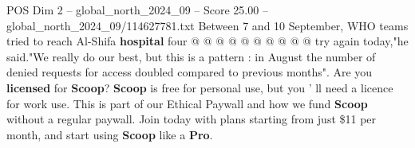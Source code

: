 \begin{textsample}{POS Dim 2 – global\_north\_2024\_09 – Score 25.00 – global\_north\_2024\_09/114627781.txt}
Between 7 and 10 September, WHO teams tried to reach Al-Shifa \textbf{hospital} four @ @ @ @ @ @ @ @ @ @ try again today,"he said."We really do our best, but this is a pattern : in August the number of denied requests for access doubled compared to previous months".
Are you \textbf{licensed} for \textbf{Scoop}? \textbf{Scoop} is free for personal use, but you ' ll need a licence for work use.
This is part of our Ethical Paywall and how we fund \textbf{Scoop} without a regular paywall.
Join today with plans starting from just \$11 per month, and start using \textbf{Scoop} like a \textbf{Pro}.

\end{textsample}
